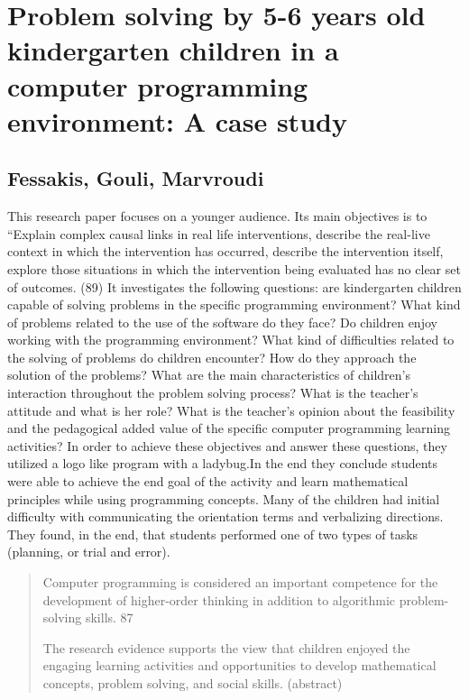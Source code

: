 \documentclass[12pt]{extarticle}
\begin{document}
{\section*{Problem solving by 5-6 years old kindergarten children in a computer programming environment: A case study}
\subsection*{Fessakis, Gouli, Marvroudi}
This research paper focuses on a younger audience. Its main objectives is to “Explain complex causal links in real life interventions, describe the real-live context in which the intervention has occurred, describe the intervention itself, explore those situations in which the intervention being evaluated has no clear set of outcomes. (89)
It investigates the following questions: are kindergarten children capable of solving problems in the specific programming environment? What kind of problems related to the use of the software do they face? Do children enjoy working with the programming environment? What kind of difficulties related to the solving of problems do children encounter?  How do they approach the solution of the problems? What are the main characteristics of children’s interaction throughout the problem solving process? What is the teacher’s attitude and what is her role? What is the teacher’s opinion about the feasibility and the pedagogical added value of the specific computer programming learning activities? 
In order to achieve these objectives and answer these questions, they utilized a logo like program with a ladybug.In the end they conclude students were able to achieve the end goal of the activity and learn mathematical principles while using programming concepts. Many of the children had initial difficulty with communicating the orientation terms and verbalizing directions. They found, in the end, that students performed one of two types of tasks (planning, or trial and error).

\begin{quotation}
    
    Computer programming is considered an important competence for the development of higher-order thinking in addition to algorithmic problem-solving skills. 87
    
    The research evidence supports the view that children enjoyed the engaging learning activities and opportunities to develop mathematical concepts, problem solving, and social skills. 	(abstract)
    

\end{quotation}}
\end{document}

